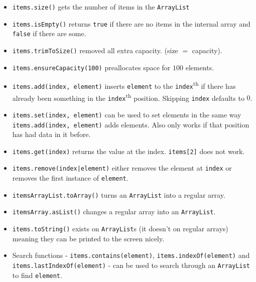 \begin{itemize}
    \item \texttt{items.size()} gets the number of items in the \texttt{ArrayList}
    \item \texttt{items.isEmpty()} returns \texttt{true} if there are no items in the internal array and \texttt{false} if there are some.
    \item \texttt{items.trimToSize()} removed all extra capacity. (size \(=\) capacity).
    \item \texttt{items.ensureCapacity(100)} preallocates space for \(100\) elements.
    \item \texttt{items.add(index, element)} inserts \texttt{element} to the \texttt{index}\textsuperscript{th} if there has already been something in the \texttt{index}\textsuperscript{th} position. Skipping \texttt{index} defaults to \(0\).
    \item \texttt{items.set(index, element)} can be used to set elements in the same way \texttt{items.add(index, element)} adds elements. Also only works if that position has had data in it before.
    \item \texttt{items.get(index)} returns the value at the index. \texttt{items[2]} does not work.
    \item \texttt{items.remove(index|element)} either removes the element at \texttt{index} or removes the first instance of \texttt{element}.
    \item \texttt{itemsArrayList.toArray()} turns an \texttt{ArrayList} into a regular array.
    \item \texttt{itemsArray.asList()} changes a regular array into an \texttt{ArrayList}.
    \item \texttt{items.toString()} exists on \texttt{ArrayList}s (it doesn't on regular arrays) meaning they can be printed to the screen nicely.
    \item Search functions - \texttt{items.contains(element)}, \texttt{items.indexOf(element)} and \texttt{items.lastIndexOf(element)} - can be used to search through an \texttt{ArrayList} to find \texttt{element}.
\end{itemize}
